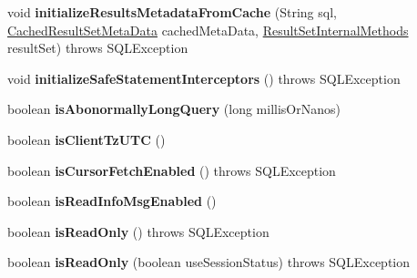 \begin{DoxyCompactItemize}
void {\bfseries initialize\+Results\+Metadata\+From\+Cache} (String sql, \mbox{\hyperlink{classcom_1_1mysql_1_1jdbc_1_1_cached_result_set_meta_data}{Cached\+Result\+Set\+Meta\+Data}} cached\+Meta\+Data, \mbox{\hyperlink{interfacecom_1_1mysql_1_1jdbc_1_1_result_set_internal_methods}{Result\+Set\+Internal\+Methods}} result\+Set)  throws S\+Q\+L\+Exception
\item 
\mbox{\label{interfacecom_1_1mysql_1_1jdbc_1_1_my_s_q_l_connection_a8a06f75640dfcdb08e2c03ad6b3ab14a}} 
void {\bfseries initialize\+Safe\+Statement\+Interceptors} ()  throws S\+Q\+L\+Exception
\item 
\mbox{\label{interfacecom_1_1mysql_1_1jdbc_1_1_my_s_q_l_connection_abb27b21ec50e1dedc08ee388a29e7972}} 
boolean {\bfseries is\+Abonormally\+Long\+Query} (long millis\+Or\+Nanos)
\item 
\mbox{\label{interfacecom_1_1mysql_1_1jdbc_1_1_my_s_q_l_connection_ae7210cfcd02e6c03f56decf8640ef14d}} 
boolean {\bfseries is\+Client\+Tz\+U\+TC} ()
\item 
\mbox{\label{interfacecom_1_1mysql_1_1jdbc_1_1_my_s_q_l_connection_a601d0bcc5e0a1c9d85b654a92c3d45d4}} 
boolean {\bfseries is\+Cursor\+Fetch\+Enabled} ()  throws S\+Q\+L\+Exception
\item 
\mbox{\label{interfacecom_1_1mysql_1_1jdbc_1_1_my_s_q_l_connection_a7e549acd1132e1cebadb9aa920a3acc2}} 
boolean {\bfseries is\+Read\+Info\+Msg\+Enabled} ()
\item 
\mbox{\label{interfacecom_1_1mysql_1_1jdbc_1_1_my_s_q_l_connection_a41c7fa2c5ac37e0169dd87ed29f1c95b}} 
boolean {\bfseries is\+Read\+Only} ()  throws S\+Q\+L\+Exception
\item 
\mbox{\label{interfacecom_1_1mysql_1_1jdbc_1_1_my_s_q_l_connection_a5563bd945d783568c0bf0549b9fcd6a9}} 
boolean {\bfseries is\+Read\+Only} (boolean use\+Session\+Status)  throws S\+Q\+L\+Exception

\end{DoxyCompactItemize}
